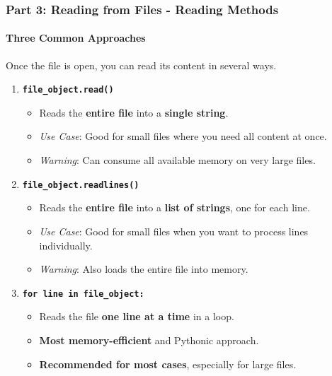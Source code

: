 \documentclass{beamer}
\begin{document}
\begin{frame}[fragile]
    \frametitle{Part 3: Reading from Files - Reading Methods}
    \framesubtitle{Three Common Approaches}

    Once the file is open, you can read its content in several ways.

    \begin{enumerate}
        \item \textbf{\texttt{file\_object.read()}}
              \begin{itemize}
                  \item Reads the \textbf{entire file} into a \textbf{single string}.
                  \item \textit{Use Case}: Good for small files where you need all content at once.
                  \item \textit{Warning}: Can consume all available memory on very large files.
              \end{itemize}

        \item \textbf{\texttt{file\_object.readlines()}}
              \begin{itemize}
                  \item Reads the \textbf{entire file} into a \textbf{list of strings}, one for each line.
                  \item \textit{Use Case}: Good for small files when you want to process lines individually.
                  \item \textit{Warning}: Also loads the entire file into memory.
              \end{itemize}

        \item \textbf{\texttt{for line in file\_object:}}
              \begin{itemize}
                  \item Reads the file \textbf{one line at a time} in a loop.
                  \item \textbf{Most memory-efficient} and Pythonic approach.
                  \item \textbf{Recommended for most cases}, especially for large files.
              \end{itemize}
    \end{enumerate}
\end{frame}
\end{document}
